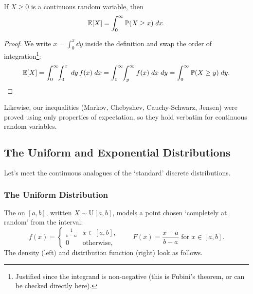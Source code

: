 \documentclass[a4paper]{scrartcl}
\begin{document}
\begin{proposition}
	If $X \geq 0$ is a continuous random variable, then
	$$
	\mathbb{E}[X] = \int_0^{\infty} \mathbb{P}(X \geq x) \; d x.
	$$
\end{proposition}
\begin{proof}
	We write $x = \int_0^x \dd y$ inside the definition and swap the order of integration\footnote{Justified since the integrand is non-negative (this is Fubini's theorem, or can be checked directly here).}:
	$$
	\mathbb{E}[X] = \int_0^{\infty}\!\! \int_0^x \; d y \, f(x)\; d x = \int_0^{\infty}\!\! \int_y^{\infty} f(x)\; d x \; d y = \int_0^{\infty} \mathbb{P}(X \geq y)\; d y. \qedhere
	$$
\end{proof}

Likewise, our inequalities (Markov, Chebyshev, Cauchy-Schwarz, Jensen) were proved using only properties of expectation, so they hold verbatim for continuous random variables.

\subsection{The Uniform and Exponential Distributions}

Let's meet the continuous analogues of the `standard' discrete distributions.

\subsubsection*{The Uniform Distribution}

The  on $[a, b]$, written $X \sim \mathrm{U}[a, b]$, models a point chosen `completely at random' from the interval:
$$
f(x) = \begin{cases}
	\frac{1}{b - a} & x \in [a, b],\\
	0 & \text{otherwise},
\end{cases}
\qquad
F(x) = \frac{x - a}{b - a} \text{ for } x \in [a, b].
$$
The density (left) and distribution function (right) look as follows.

\begin{center}
\qquad
{}
\end{center}
\end{document}
